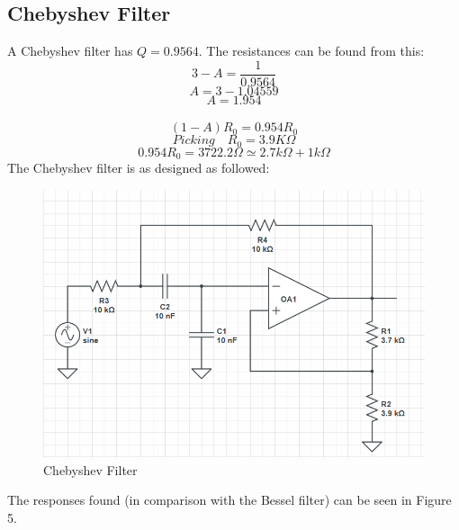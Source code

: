 \documentclass[12pt]{article}
\begin{document}
		\subsection{Chebyshev Filter}
		A Chebyshev filter has $Q = 0.9564$. The resistances can be found from this:
		$$ 3-A = \frac{1}{0.9564}$$
		$$ A = 3 - 1.04559$$
		$$ A = 1.954 $$\\
		$$ (1-A)R_{0} = 0.954R_{0}$$
		$$Picking\quad R_{0} = 3.9K\Omega$$
		$$0.954R_{0} = 3722.2\Omega \simeq 2.7k\Omega+1k\Omega$$ 	
		The Chebyshev filter is as designed as followed:
		\begin{figure}[h!]
			\centering
			\includegraphics[width=\columnwidth]{Capture2}
			\caption{Chebyshev Filter}
		\end{figure}
		\newpage
		The responses found (in comparison with the Bessel filter) can be seen in Figure 5.\\
\end{document}
